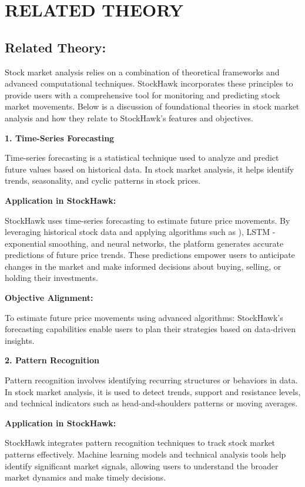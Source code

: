\chapter{RELATED THEORY}
\section{Related Theory:}
Stock market analysis relies on a combination of theoretical frameworks and advanced computational techniques. StockHawk incorporates these principles to provide users with a comprehensive tool for monitoring and predicting stock market movements. Below is a discussion of foundational theories in stock market analysis and how they relate to StockHawk’s features and objectives.

\textbf{1. Time-Series Forecasting}

Time-series forecasting is a statistical technique used to analyze and predict future values based on historical data. In stock market analysis, it helps identify trends, seasonality, and cyclic patterns in stock prices.

\textbf{Application in StockHawk:}

StockHawk uses time-series forecasting to estimate future price movements. By leveraging historical stock data and applying algorithms such as ), LSTM - exponential smoothing, and neural networks, the platform generates accurate predictions of future price trends. These predictions empower users to anticipate changes in the market and make informed decisions about buying, selling, or holding their investments.

\textbf{ Objective Alignment:}

To estimate future price movements using advanced algorithms: StockHawk's forecasting capabilities enable users to plan their strategies based on data-driven insights.

\textbf{2. Pattern Recognition}

Pattern recognition involves identifying recurring structures or behaviors in data. In stock market analysis, it is used to detect trends, support and resistance levels, and technical indicators such as head-and-shoulders patterns or moving averages.

\textbf{Application in StockHawk:}

StockHawk integrates pattern recognition techniques to track stock market patterns effectively. Machine learning models and technical analysis tools help identify significant market signals, allowing users to understand the broader market dynamics and make timely decisions.


